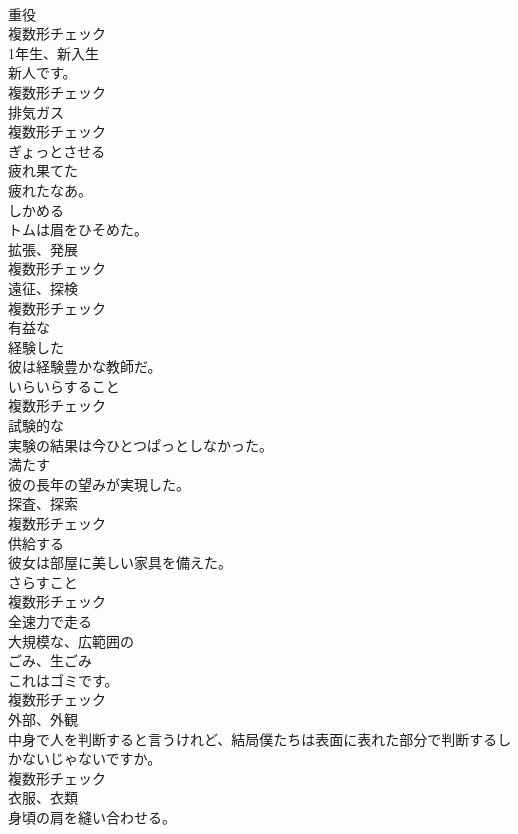 \documentclass[8pt]{extreport}
\begin{document}
\begin{CJK}{UTF8}{min}
\\	[名詞]	重役	
\\	複数形チェック
\\	[名詞]	1年生、新入生	
\\	新人です。	
\\	複数形チェック
\\	[名詞]	排気ガス	
\\	複数形チェック
\\	[形容詞]	ぎょっとさせる	
\\	[形容詞]	疲れ果てた	
\\	疲れたなあ。	
\\	[動詞]	しかめる	
\\	トムは眉をひそめた。	
\\	[名詞]	拡張、発展	
\\	複数形チェック
\\	[名詞]	遠征、探検	
\\	複数形チェック
\\	[形容詞]	有益な	
\\	[形容詞]	経験した	
\\	彼は経験豊かな教師だ。	
\\	[名詞]	いらいらすること	
\\	複数形チェック
\\	[形容詞]	試験的な	
\\	実験の結果は今ひとつぱっとしなかった。	
\\	[動詞]	満たす	
\\	彼の長年の望みが実現した。	
\\	[名詞]	探査、探索	
\\	複数形チェック
\\	[動詞]	供給する	
\\	彼女は部屋に美しい家具を備えた。	
\\	[名詞]	さらすこと	
\\	複数形チェック
\\	[動詞]	全速力で走る	
\\	[形容詞]	大規模な、広範囲の	
\\	[名詞]	ごみ、生ごみ	
\\	これはゴミです。	
\\	複数形チェック
\\	[名詞]	外部、外観	
\\	中身で人を判断すると言うけれど、結局僕たちは表面に表れた部分で判断するしかないじゃないですか。	
\\	複数形チェック
\\	[名詞]	衣服、衣類	
\\	身頃の肩を縫い合わせる。	

\end{CJK}
\end{document}
